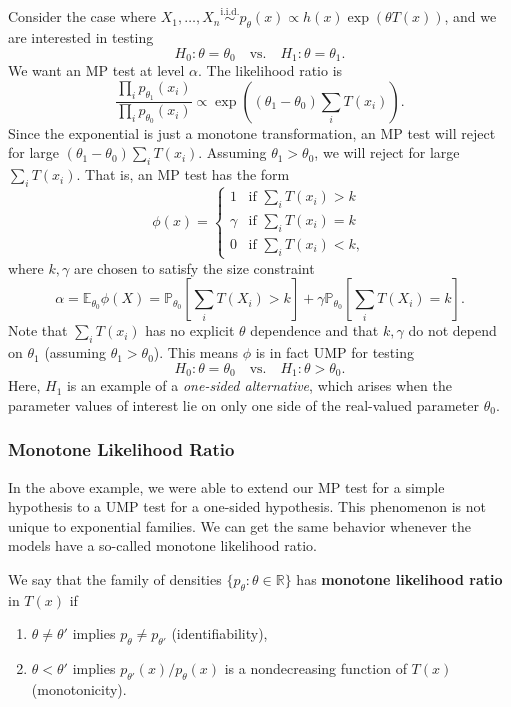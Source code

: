 \begin{exam}
Consider the case where $X_1, \ldots, X_n \stackrel{\mathrm{i.i.d.}}{\sim} 
p_\theta(x) \propto h(x)\exp(\theta T(x))$, and we are interested in testing
\[
  H_0 : \theta = \theta_0 \quad \text{vs.} \quad H_1 : \theta = \theta_1.
\]
We want an MP test at level $\alpha$. The likelihood ratio is
\[
  \frac{\prod_i p_{\theta_1}(x_i)}{\prod_i p_{\theta_0}(x_i)} 
  \propto \exp\!\left((\theta_1 - \theta_0)\sum_i T(x_i)\right).
\]
Since the exponential is just a monotone transformation, an MP test will reject for 
large $(\theta_1 - \theta_0)\sum_i T(x_i)$. Assuming $\theta_1 > \theta_0$, we will 
reject for large $\sum_i T(x_i)$. That is, an MP test has the form
\[
  \phi(x) = \begin{cases}
    1      & \text{if } \sum_i T(x_i) > k \\
    \gamma & \text{if } \sum_i T(x_i) = k \\
    0      & \text{if } \sum_i T(x_i) < k,
  \end{cases}
\]
where $k, \gamma$ are chosen to satisfy the size constraint
\[
  \alpha = \mathbb{E}_{\theta_0}\phi(X) 
  = \mathbb{P}_{\theta_0}\!\left[\sum_i T(X_i) > k\right] 
  + \gamma \mathbb{P}_{\theta_0}\!\left[\sum_i T(X_i) = k\right].
\]
Note that $\sum_i T(x_i)$ has no explicit $\theta$ dependence and that $k, \gamma$ 
do not depend on $\theta_1$ (assuming $\theta_1 > \theta_0$). This means $\phi$ is 
in fact UMP for testing
\[
  H_0 : \theta = \theta_0 \quad \text{vs.} \quad H_1 : \theta > \theta_0.
\]
Here, $H_1$ is an example of a \emph{one-sided alternative}, which arises when the 
parameter values of interest lie on only one side of the real-valued parameter 
$\theta_0$.
\end{exam}

\subsubsection{Monotone Likelihood Ratio}

In the above example, we were able to extend our MP test for a simple hypothesis to a UMP test for a one-sided hypothesis. This phenomenon is not unique to exponential families. We can get the same behavior whenever the models have a so-called monotone likelihood ratio.
\begin{defn}
We say that the family of densities $\{p_\theta : \theta \in \mathbb{R}\}$ has 
\textbf{monotone likelihood ratio} in $T(x)$ if
\begin{enumerate}
  \item[(i)] $\theta \ne \theta'$ implies $p_\theta \ne p_{\theta'}$ 
  (identifiability),
  \item[(ii)] $\theta < \theta'$ implies $p_{\theta'}(x)/p_\theta(x)$ is a 
  nondecreasing function of $T(x)$ (monotonicity).
\end{enumerate}
\end{defn}

